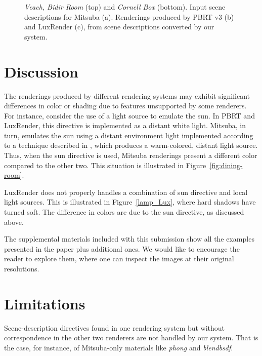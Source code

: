 \begin{figure}
{}	
\caption{\textit{Veach, Bidir Room} (top) and \textit{Cornell Box} (bottom). Input scene descriptions for 
 Mitsuba (a). Renderings produced by PBRT v3 (b) and LuxRender (c),
 from scene descriptions converted by our system.}
\label{fig:bidir-cornell}
\end{figure}

\section{Discussion}

The renderings produced by different rendering systems may exhibit significant differences in color or shading due to features unsupported by some renderers.  
For instance, consider the use of a light source to emulate the sun. In PBRT and LuxRender, this directive is implemented as a distant white light.
Mitsuba, in turn, emulates the sun using a distant environment light implemented according to a technique 
described in \cite{Preetham}, which produces a warm-colored, distant light source. Thus, when the sun directive is used, Mitsuba renderings present a different color compared to the other two. This situation is illustrated in Figure~\ref{fig:dining-room}.

LuxRender does not properly handles a combination of sun directive and local light sources. This is illustrated in Figure~\ref{lamp_Lux}, where hard shadows have turned soft. The difference in colors are due to the sun directive, as discussed above.

The supplemental materials included with this submission show all the examples presented in the paper plus additional ones. We would like to encourage the reader to explore them, where one can inspect the images at their original resolutions.

\section{Limitations}
Scene-description directives found in one rendering system but without correspondence in the other two renderers are not handled by our system. That is the case, for instance, of Mitsuba-only materials like \textit{phong} and \textit{blendbsdf}. 

